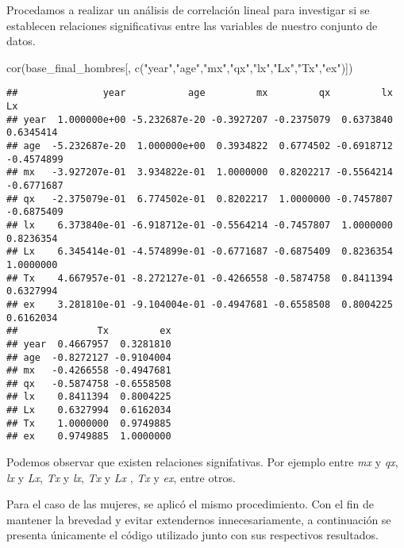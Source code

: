 \documentclass[
]{article}
\newenvironment{Shaded}{\begin{snugshade}}{\end{snugshade}}
\newcommand{\FunctionTok}[1]{\textcolor[rgb]{0.00,0.00,0.00}{#1}}
\newcommand{\NormalTok}[1]{#1}
\newcommand{\StringTok}[1]{\textcolor[rgb]{0.31,0.60,0.02}{#1}}
\begin{document}
Procedamos a realizar un análisis de correlación lineal para investigar
si se establecen relaciones significativas entre las variables de
nuestro conjunto de datos.

\begin{Shaded}
\begin{Highlighting}[]
\FunctionTok{cor}\NormalTok{(base\_final\_hombres[, }\FunctionTok{c}\NormalTok{(}\StringTok{"year"}\NormalTok{,}\StringTok{"age"}\NormalTok{,}\StringTok{"mx"}\NormalTok{,}\StringTok{"qx"}\NormalTok{,}\StringTok{"lx"}\NormalTok{,}\StringTok{"Lx"}\NormalTok{,}\StringTok{"Tx"}\NormalTok{,}\StringTok{"ex"}\NormalTok{)])}
\end{Highlighting}
\end{Shaded}

\begin{verbatim}
##               year           age         mx         qx         lx         Lx
## year  1.000000e+00 -5.232687e-20 -0.3927207 -0.2375079  0.6373840  0.6345414
## age  -5.232687e-20  1.000000e+00  0.3934822  0.6774502 -0.6918712 -0.4574899
## mx   -3.927207e-01  3.934822e-01  1.0000000  0.8202217 -0.5564214 -0.6771687
## qx   -2.375079e-01  6.774502e-01  0.8202217  1.0000000 -0.7457807 -0.6875409
## lx    6.373840e-01 -6.918712e-01 -0.5564214 -0.7457807  1.0000000  0.8236354
## Lx    6.345414e-01 -4.574899e-01 -0.6771687 -0.6875409  0.8236354  1.0000000
## Tx    4.667957e-01 -8.272127e-01 -0.4266558 -0.5874758  0.8411394  0.6327994
## ex    3.281810e-01 -9.104004e-01 -0.4947681 -0.6558508  0.8004225  0.6162034
##              Tx         ex
## year  0.4667957  0.3281810
## age  -0.8272127 -0.9104004
## mx   -0.4266558 -0.4947681
## qx   -0.5874758 -0.6558508
## lx    0.8411394  0.8004225
## Lx    0.6327994  0.6162034
## Tx    1.0000000  0.9749885
## ex    0.9749885  1.0000000
\end{verbatim}

Podemos observar que existen relaciones signifativas. Por ejemplo entre
\emph{mx} y \emph{qx}, \emph{lx} y \emph{Lx}, \emph{Tx} y \emph{lx},
\emph{Tx} y \emph{Lx} , \emph{Tx} y \emph{ex}, entre otros.

Para el caso de las mujeres, se aplicó el mismo procedimiento. Con el
fin de mantener la brevedad y evitar extendernos innecesariamente, a
continuación se presenta únicamente el código utilizado junto con sus
respectivos resultados.
\end{document}
